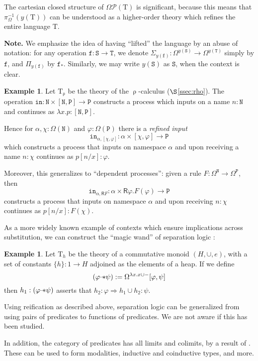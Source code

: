 \documentclass[12pt]{article}
\theoremstyle{definition}
\newtheorem{example}[theorem]{Example}
\newcommand{\msf}[1]{\mathsf{#1}}
\newcommand{\msc}[1]{\mathscr{#1}}
\newcommand{\mrm}[1]{\mathrm{#1}}
\newcommand{\mtt}[1]{\mathtt{#1}}
\newcommand{\ra}{\Rightarrow}
\newcommand{\T}{\mrm{T}}
\newcommand{\pow}{\msc{P}}
\newcommand{\wand}{\mbox{--\!$\ast$}}
\newcommand{\tts}{\mtt{S}}
\newcommand{\ttt}{\mtt{T}}
\newcommand{\ttf}{\mtt{f}}
\newcommand{\N}{\mtt{N}}
\newcommand{\PP}{\mtt{P}}
\newcommand{\tti}{\mtt{in}}
\begin{document}
The cartesian closed structure of $\Omega\pow(\T)$ is significant, because this means that $\pi_\Omega^{-1}(y(\T))$ can be understood as a higher-order theory which refines the entire language $\T$.

\textbf{Note.} We emphasize the idea of having ``lifted'' the language by an abuse of notation: for any operation $\ttf:\tts\to \ttt$, we denote $\Sigma_{y(\ttf)}:\Omega^{y(\tts)}\to \Omega^{y(\ttt)}$ simply by $\ttf$, and $\Pi_{y(\ttf)}$ by $\ttf_*$. Similarly, we may write $y(\tts)$ as $\tts$, when the context is clear.

\begin{example}
    Let $\T_{\uprho}$ be the theory of the $\uprho$-calculus ($\S$\ref{ssec:rho}). The operation $\tti:\N\times [\N,\PP]\to \PP$ constructs a process which inputs on a name $n:\N$ and continues as $\lambda x.p:[\N,\PP]$.
    
    Hence for $\alpha,\chi:\Omega(\N)$ and $\varphi:\Omega(\PP)$ there is a \textit{refined input}
    \[\tti_{\alpha,[\chi,\varphi]}:\alpha\times [\chi,\varphi]\to \PP\] which constructs a process that inputs on namespace $\alpha$ and upon receiving a name $n:\chi$ continues as $p[n/x]:\varphi$.
    
    Moreover, this generalizes to ``dependent processes'': given a rule $F:\Omega^\N\to \Omega^\PP$, then
    \[\tti_{\alpha,\msf{R}F}:\alpha\times \msf{R}\varphi.F(\varphi)\to \PP\]
    constructs a process that inputs on namespace $\alpha$ and upon receiving $n:\chi$ continues as $p[n/x]:F(\chi)$.
\end{example}

As a more widely known example of contexts which ensure implications across substitution, we can construct the ``magic wand'' of separation logic \cite{refine}: 
\begin{example}
    Let $\T_h$ be the theory of a commutative monoid $(H,\cup,e)$, with a set of constants $\{h\}:1\to H$ adjoined as the elements of a heap. If we define 
    \[(\varphi \wand \psi) := \Omega^{\lambda x.x\cup-}[\varphi, \psi]\]
    then $h_1:(\varphi \wand \psi)$ asserts that $h_2:\varphi\ra h_1\cup h_2:\psi$.
    
    Using reification as described above, separation logic can be generalized from using pairs of predicates to functions of predicates. We are not aware if this has been studied.
\end{example}
    
In addition, the category of predicates has all limits and colimits, by a result of \cite{burstall}. These can be used to form modalities, inductive and coinductive types, and more.
    
\end{document}
